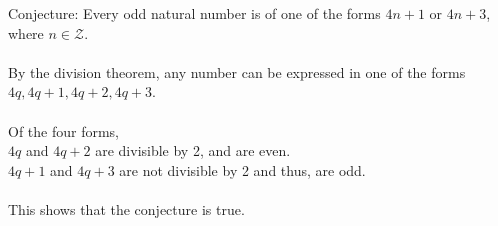 \documentclass[a4paper]{article}
\begin{document}
Conjecture: Every odd natural number is of one of the forms $4n + 1$ or $4n + 3$, where
$n \in \mathcal{Z}$.\\\\
By the division theorem, any number can be expressed in one of the forms $4q, 4q+1, 4q+2, 4q+3$.\\\\
Of the four forms,\\
$4q$ and $4q+2$ are divisible by 2, and are even.\\
$4q+1$ and $4q+3$ are not divisible by 2 and thus, are odd.\\\\
This shows that the conjecture is true.
\end{document}
